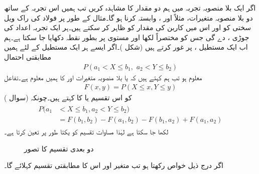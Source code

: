 اگر ایک بلا منصوبہ تجربہ میں ہم دو مقدار کا مشاہدہ کریں تب ہمیں اس تجربہ کے ساتھ دو بلا منصوبہ متغیرات، مثلاً  اور ، وابستہ کرنا ہو گا۔مثال کے طور پر فولاد کی راک ویل سختی کو    اور اس میں کاربن کی مقدار کو  ظاہر کر سکتے ہیں۔ہر ایک تجربہ اعداد کی جوڑی ،  دے گی جس کو مختصراً  لکھا اور  مستوی پر بطور نقطہ دکھایا جا سکتا ہے۔ہم اب ایک مستطیل ،  پر غور کرتے ہیں (شکل )۔اگر ایسے ہر ایک مستطیل کے لئے  ہمیں مطابقتی احتمال
\begin{align*}
P(a_1<X\le b_1,\,\, a_2<Y\le b_2)
\end{align*}
معلوم ہو تب ہم کہتے ہیں کہ   یا بلا منصوبہ متغیرات  اور  کا  ہمیں معلوم ہے۔تفاعل
\begin{align}\label{مساوات_شماریات_ایک_سے_زائد_الف}
F(x,y)=P(X\le x,Y\le y)
\end{align}
کو اس تقسیم یا  کا  کہتے ہیں۔چونکہ (سوال )
\begin{gather}
\begin{aligned}\label{مساوات_شماریات_ایک_سے_زائد_ب}
P(a_1&<X\le b_1,a_2<Y\le b_2)\\
&=F(b_1,b_2)-F(a_1,b_2)-F(b_1,a_2)+F(a_1,a_2)
\end{aligned}
\end{gather}
لکھا جا سکتا ہے لہٰذا مساوات  تقسیم کو یکتا طور پر تعین کرتا ہے۔
\begin{figure}
\centering
{}
\caption{دو بعدی تقسیم کا تصور}
\label{شکل_شماریات_دو_بعدی_تقسیم}
\end{figure}

اگر  درج ذیل خواص رکھتا ہو تب متغیر  اور اس کا مطابقتی تقسیم  کہلائے گا۔


